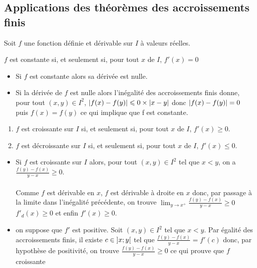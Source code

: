\subsection{Applications des théorèmes des accroissements finis}
Soit \(f\) une fonction définie et dérivable sur \(I\) à valeurs réelles.

\begin{defprop}
    \(f\) est constante si, et seulement si, pour tout \(x\) de \(I\), \(f '(x) = 0\)
\end{defprop}
\begin{dem}
    \begin{itemize}
        \item \impdir Si \(f\) est constante alors sa dérivée est nulle.
        \item \imprec Si la dérivée de \(f\) est nulle alors l’inégalité des accroissements finis donne, pour tout \((x, y) \in I^2\), \(\left\lvert f (x) - f (y)\right\rvert \leqslant 0 \times \left\lvert x - y\right\rvert\) donc \(\left\lvert f (x) - f (y)\right\rvert = 0\) puis \(f (x) = f (y)\) ce qui implique que f est constante.
    \end{itemize}
\end{dem}
\begin{defprop}
    \begin{enumerate}
        \item \(f\) est croissante sur \(I\) si, et seulement si, pour tout \(x\) de \(I\), \(f '(x) \geq 0\).
        \item \(f\) est décroissante sur \(I\) si, et seulement si, pour tout \(x\) de \(I\), \(f '(x) \leq 0\).
    \end{enumerate}
\end{defprop}

\begin{dem}
    \begin{itemize}
        
        \item \impdir Si \(f\) est croissante sur \(I\) alors, pour tout \((x, y) \in I^2\) tel que \(x < y\), on a \(\frac{f (y) - f (x) }{y - x } \geq 0\).\\~\\
        Comme \(f\) est dérivable en \(x\), \(f\) est dérivable à droite en \(x\) donc, par passage à la limite dans l’inégalité précédente, on trouve \(\lim_{ y\to x^+} \frac{f (y) - f (x)}{ y - x} \geq 0\) \cad \(f ' _d(x) \geq 0\) et enfin \(f '(x) \geq 0\).
        \item \imprec on suppose que \(f '\) est positive. Soit \((x, y) \in I^2\) tel que \(x < y\). Par égalité des accroissements finis, il existe \(c \in \left]x;y\right[ \) tel que \(\frac{f (y) - f (x)}{y - x }= f'(c)\) donc, par hypothèse de positivité, on trouve \(\frac{f (y) - f (x)}{y - x} \geq 0\) ce qui prouve que \(f\) croissante
    \end{itemize}
\end{dem}

